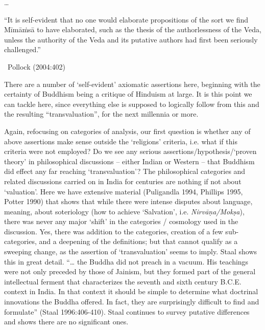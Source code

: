 \begin{myquote}
…
\end{myquote}

\vspace{.1cm}

\begin{myquote}
“It is self-evident that no one would elaborate propositions of the sort we find {Mīmāṁsā} to have elaborated, such as the thesis of the authorlessness of the Veda, unless the authority of the Veda and its putative authors had first been seriously challenged.” 

~\hfill Pollock (2004:402)
\end{myquote}

There are a number of ‘self-evident’ axiomatic assertions here, beginning with the certainty of Buddhism being a critique of Hinduism at large. It is this point we can tackle here, since everything else is supposed to logically follow from this and the resulting “transvaluation”, for the next millennia or more.

Again, refocusing on categories of analysis, our first question is whether any of above assertions make sense outside the ‘religions’ criteria, i.e. what if this criteria were not employed? Do we see any serious assertions/hypothesis/‘proven theory’ in philosophical discussions – either Indian or Western – that Buddhism did effect any far reaching ‘transvaluation’? The philosophical categories and related discussions carried on in India for centuries are nothing if not about ‘valuation’. Here we have extensive material (Puligandla 1994, Phillips 1995, Potter 1990) that shows that while there were intense disputes about language, meaning, about soteriology (how to achieve ‘Salvation’, i.e. \textit{Nirvāṇa/Mokṣa}), there was never any major ‘shift’ in the categories / cosmology used in the discussion. Yes, there was addition to the categories, creation of a few sub-categories, and a deepening of the definitions; but that cannot qualify as a sweeping change, as the assertion of ‘transvaluation’ seems to imply. Staal shows this in great detail. “… the Buddha did not preach in a vacuum. His teachings were not only preceded by those of Jainism, but they formed part of the general intellectual ferment that characterizes the seventh and sixth century B.C.E. context in India. In that context it should be simple to determine what doctrinal innovations the Buddha offered. In fact, they are surprisingly difficult to find and formulate” (Staal 1996:406-410). Staal continues to survey putative differences and shows there are no significant ones.

